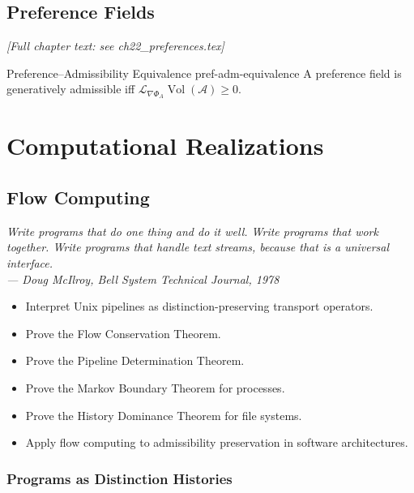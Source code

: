 \documentclass[12pt,twoside,openright]{book}
\newcommand{\adm}{\mathcal{A}}
\newcommand{\Vol}{\operatorname{Vol}}
\newenvironment{epigraph}[2]{%
  \vspace{1em}\begin{flushright}
  \begin{minipage}{0.72\textwidth}
  \itshape\small #1\\[0.4em]
  \upshape\footnotesize\sffamily\color{DistGray}--- #2
  \end{minipage}\end{flushright}\vspace{1.5em}}{}
\newenvironment{objectives}{%
  \begin{tcolorbox}[colback=DistBlue!5,colframe=DistBlue,
    title={\faCheckCircle\enspace Learning Objectives},
    fonttitle=\sffamily\bfseries\color{white},
    attach boxed title to top left={yshift=-2mm,xshift=4mm},
    boxed title style={colback=DistBlue},breakable]
  \begin{itemize}[leftmargin=*,nosep]}{%
  \end{itemize}\end{tcolorbox}\vspace{1em}}
\begin{document}
\chapter{Preference Fields}
\label{ch:preference-fields}
\emph{[Full chapter text: see ch22\_preferences.tex]}

\begin{theorem}{Preference--Admissibility Equivalence}%
  {pref-adm-equivalence}
  A preference field is generatively admissible iff
  $\mathcal{L}_{\nabla\Phi_A}\Vol(\adm)\ge0$.
\end{theorem}

\part{Computational Realizations}

\chapter{Flow Computing}
\label{ch:flow-computing}

\begin{epigraph}{%
  Write programs that do one thing and do it well.
  Write programs that work together.
  Write programs that handle text streams, because that is
  a universal interface.}%
  {Doug McIlroy, \textit{Bell System Technical Journal}, 1978}
\end{epigraph}

\begin{objectives}
  \item Interpret Unix pipelines as distinction-preserving
        transport operators.
  \item Prove the Flow Conservation Theorem.
  \item Prove the Pipeline Determination Theorem.
  \item Prove the Markov Boundary Theorem for processes.
  \item Prove the History Dominance Theorem for file systems.
  \item Apply flow computing to admissibility preservation
        in software architectures.
\end{objectives}

\section{Programs as Distinction Histories}
\end{document}
